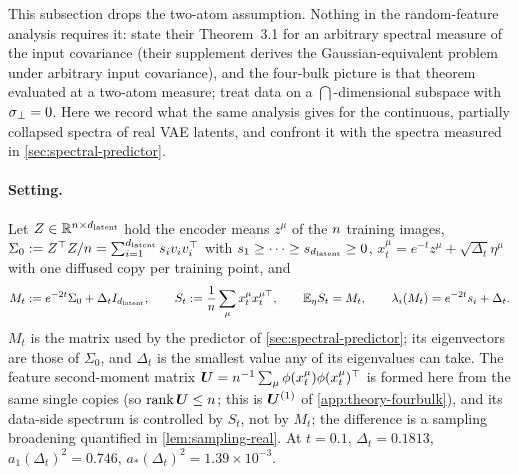This subsection drops the two-atom assumption. Nothing in the random-feature analysis requires it: \citet{bonnaire2025} state their Theorem~3.1 for an arbitrary spectral measure of the input covariance (their supplement derives the Gaussian-equivalent problem under arbitrary input covariance), and the four-bulk picture is that theorem evaluated at a two-atom measure; \citet{george2025dsm} treat data on a $\dint$-dimensional subspace with $\sigma_{\perp}=0$. Here we record what the same analysis gives for the continuous, partially collapsed spectra of real VAE latents, and confront it with the spectra measured in \cref{sec:spectral-predictor}.

\paragraph{Setting.}
Let $Z\in\mathbb{R}^{n\times d_{\mathrm{latent}}}$ hold the encoder means $z^\mu$ of the $n$ training images, $\Sigma_0:=Z^\top Z/n=\sum_{i=1}^{d_{\mathrm{latent}}}s_iv_iv_i^\top$ with $s_1\ge\dots\ge s_{d_{\mathrm{latent}}}\ge0$, $x_t^\mu=e^{-t}z^\mu+\sqrt{\Delta_t}\eta^\mu$ with one diffused copy per training point, and
\begin{equation}\label{eq:Mt-real}
M_t:=e^{-2t}\Sigma_0+\Delta_tI_{d_{\mathrm{latent}}},\qquad S_t:=\frac1{n}\sum_\mu x_t^\mu x_t^{\mu\top},\qquad \mathbb{E}_\eta S_t=M_t,\qquad \lambda_i(M_t)=e^{-2t}s_i+\Delta_t .
\end{equation}
$M_t$ is the matrix used by the predictor of \cref{sec:spectral-predictor}; its eigenvectors are those of $\Sigma_0$, and $\Delta_t$ is the smallest value any of its eigenvalues can take. The feature second-moment matrix $\bm{U}=n^{-1}\sum_\mu\phi(x_t^\mu)\phi(x_t^\mu)^\top$ is formed here from the same single copies (so $\operatorname{rank}\bm{U}\le n$; this is $\bm{U}^{(1)}$ of \cref{app:theory-fourbulk}), and its data-side spectrum is controlled by $S_t$, not by $M_t$; the difference is a sampling broadening quantified in \cref{lem:sampling-real}. At $t=0.1$, $\Delta_t=0.1813$, $a_1(\Delta_t)^2=0.746$, $a_\ast(\Delta_t)^2=1.39\times10^{-3}$.


